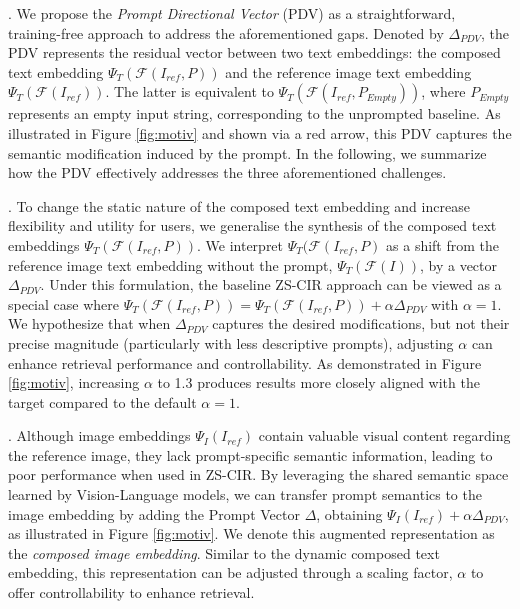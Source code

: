 . We propose the \emph{Prompt Directional Vector} (PDV) as a straightforward, training-free approach to address the aforementioned gaps. Denoted by $\Delta_{PDV}$, the PDV represents the residual vector between two text embeddings: the composed text embedding $\Psi_{T}(\mathcal{F}(I_{ref},P))$ and the reference image text embedding $\Psi_{T}(\mathcal{F}(I_{ref}))$. The latter is equivalent to $\Psi_{T}(\mathcal{F}(I_{ref}, P_{Empty}))$, where $P_{Empty}$ represents an empty input string, corresponding to the unprompted baseline. As illustrated in Figure \ref{fig:motiv} and shown via a red arrow, this PDV captures the semantic modification induced by the prompt. In the following, we summarize how the PDV effectively addresses the three aforementioned challenges.

. To change the static nature of the composed text embedding and increase flexibility and utility for users, we generalise the synthesis of the composed text embeddings $\Psi_{T}(\mathcal{F}(I_{ref}, P))$. We interpret $\Psi_{T}(\mathcal{F}(I_{ref}, P)$ as a shift from the reference image text embedding without the prompt, $\Psi_{T}(\mathcal{F}(I))$, by a vector $\Delta_{PDV}$. Under this formulation, the baseline ZS-CIR approach can be viewed as a special case where $\Psi_{T}(\mathcal{F}(I_{ref}, P)) = \Psi_{T}(\mathcal{F}(I_{ref}, P)) + \alpha\Delta_{PDV}$ with $\alpha=1$. We hypothesize that when $\Delta_{PDV}$ captures the desired modifications, but not their precise magnitude (particularly with less descriptive prompts), adjusting $\alpha$ can enhance retrieval performance and controllability. As demonstrated in Figure \ref{fig:motiv}, increasing $\alpha$ to 1.3 produces results more closely aligned with the target compared to the default $\alpha=1$.

    
. Although image embeddings $\Psi_{I}(I_{ref})$ contain valuable visual content regarding the reference image, they lack prompt-specific semantic information, leading to poor performance when used in ZS-CIR. By leveraging the shared semantic space learned by Vision-Language models, we can transfer prompt semantics to the image embedding by adding the Prompt Vector $\Delta$, obtaining $\Psi_{I}(I_{ref}) + \alpha\Delta_{PDV}$, as illustrated in Figure \ref{fig:motiv}. We denote this augmented representation as the \textit{composed image embedding}. Similar to the dynamic composed text embedding, this representation can be adjusted through a scaling factor, $\alpha$ to offer controllability to enhance retrieval.


